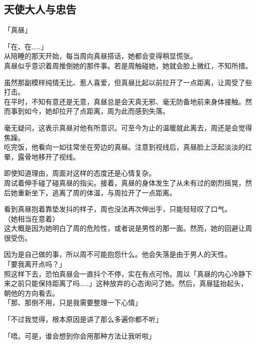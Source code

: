 \subsection{天使大人与忠告}

「真昼」

「在、在……」\\

从陪睡的那天开始，每当周向真昼搭话，她都会变得稍显慌张。\\

真昼似乎意识着周推倒她的那件事。若是周触碰她，她就会脸上微红，不知所措。

虽然那副模样纯情无比、惹人喜爱，但真昼比起以前拉开了一点距离，让周受了些打击。\\

在平时，不知有意还是无意，真昼总是会天真无邪、毫无防备地前来身体接触。然而事到如今，她却拉开了点距离，周为此而感到失落。

毫无疑问，这表示真昼对他有所意识。可至今为止的温暖就此离去，周还是会觉得焦躁。\\

吃完饭，他看向一如往常坐在旁边的真昼。注意到视线后，真昼脸上泛起淡淡的红晕，露骨地移开了视线。

即使知道理由，周面对这样的态度还是心情复杂。\\

周试着伸手碰了碰真昼的指尖。接着，真昼的身体发生了从未有过的剧烈摇晃，然后她重新坐下，逃离了周的体温，与周拉开了一点距离。

看到真昼抱着靠垫发抖的样子，周也没法再次伸出手，只能轻轻叹了口气。\\

（她相当在意着）\\

这大概是因为她明白了周的危险性，或者说是男性的那一面。然而，她的回避让周很受伤。

因为是自己做的事，所以周不可能抱怨什么。他会失落是由于男人的天性。\\

「要我离开点吗？」\\

照这样下去，恐怕真昼会一直抖个不停，实在有点可怜。周以「真昼的内心冷静下来之前只能保持距离了吗……」这种放弃的心态询问了她。然后，真昼猛抬起头，朝他的方向看去。\\

「那、那倒不用，只是我需要整理一下心情」

「不过我觉得，根本原因是讲了那么多遍你都不听」

「唔。可是，谁会想到你会用那种方法让我听啦」

